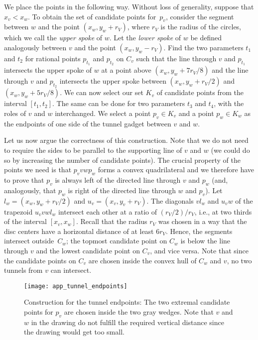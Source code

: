 \documentclass[11pt,a4paper]{article}
\begin{document}
We place the points in the following way.
Without loss of generality, suppose that $x_v < x_w$.
To obtain the set of candidate points for~$p_v$, consider the segment between $w$ and the point $(x_w, y_w + r_V)$, where $r_V$ is the radius of the circles, which we call the \emph{upper spoke} of $w$.
Let the \emph{lower spoke} of $w$ be defined analogously between $v$ and the point $(x_w, y_w\!-\!r_V)$.
Find the two parameters $t_1$ and $t_2$ for rational points $p_{t_1}$ and $p_{t_2}$ on $C_v$ such that the line through $v$ and $p_{t_1}$ intersects the upper spoke of $w$ at a point above $(x_w, y_w + 7 r_V/8)$ and the line through $v$ and $p_{t_2}$ intersects the upper spoke between $(x_w, y_w + r_V/2)$ and $(x_w, y_w + 5 r_V/8)$.
We can now select our set $K_v$ of candidate points from the interval $[t_1, t_2]$.
The same can be done for two parameters $t_3$ and $t_4$, with the roles of $v$ and $w$ interchanged.
We select a point $p_v \in K_v$ and a point $p_w \in K_w$ as the endpoints of one side of the tunnel gadget between $v$ and $w$.

Let us now argue the correctness of this construction.
Note that we do not need to require the sides to be parallel to the supporting line of $v$ and $w$ (we could do so by increasing the number of candidate points).
The crucial property of the points we need is that $p_v v w p_w$ forms a convex quadrilateral and we therefore have to prove that $p_v$ is always left of the directed line through $v$ and $p_w$ (and, analogously, that $p_w$ is right of the directed line through $w$ and $p_v$).
Let $l_w = (x_w, y_w + r_V/2)$ and $u_v = (x_v, y_v + r_V)$.
The diagonals $v l_w$ and $u_v w$ of the trapezoid $u_v v w l_w$ intersect each other at a ratio of $(r_V/2)/ r_V$, i.e., at two thirds of the interval $[x_v, x_w]$.
Recall that the radius $r_V$ was chosen in a way that the disc centers have a horizontal distance of at least $6r_V$.
Hence, the segments intersect outside~$C_w$;
the topmost candidate point on $C_w$ is below the line through $v$ and the lowest candidate point on $C_v$, and vice versa.
Note that since the candidate points on $C_v$ are chosen inside the convex hull of $C_w$ and $v$, no two tunnels from $v$ can intersect.


\begin{figure}
\centering
\texttt{[image: app\_tunnel\_endpoints]}
\caption{Construction for the tunnel endpoints: The two extremal candidate points for $p_v$ are chosen inside the two gray wedges.
Note that $v$ and $w$ in the drawing do not fulfill the required vertical distance since the drawing would get too small.
}
\label{fig_app_tunnel_endpoints}
\end{figure}
\end{document}
